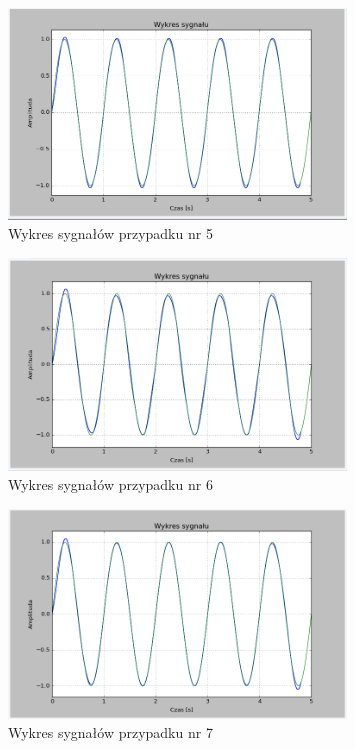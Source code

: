 \documentclass{article}
\begin{document}
    \begin{figure}[h!]
        \centering
        \includegraphics[width=0.8\textwidth]{img/1/sinc_5.png}
        \caption{Wykres sygnałów przypadku nr 5}
    \end{figure}
    \FloatBarrier

    \begin{figure}[h!]
        \centering
        \includegraphics[width=0.8\textwidth]{img/1/sinc_10.png}
        \caption{Wykres sygnałów przypadku nr 6}
    \end{figure}
    \FloatBarrier

    \begin{figure}[h!]
        \centering
        \includegraphics[width=0.8\textwidth]{img/1/sinc25.png}
        \caption{Wykres sygnałów przypadku nr 7}
    \end{figure}
    \FloatBarrier
\end{document}
